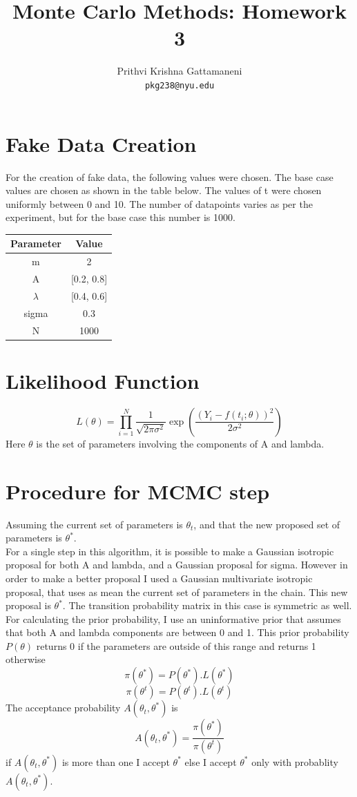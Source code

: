 \documentclass{article}
\title{Monte Carlo Methods: Homework 3}
\author{
  Prithvi Krishna Gattamaneni\\
  \texttt{pkg238@nyu.edu} \\
}
\begin{document}
\maketitle

\section{Fake Data Creation} %
For the creation of fake data, the following values were chosen. The base case values are chosen as shown in the table below. The values of t were chosen uniformly between 0 and 10. The number of datapoints varies as per the experiment, but for the base case this number is 1000.\\
\begin{center}
	\begin{tabular}{ |c| c| }
		\hline
		Parameter & Value\\
		\hline
		m & 2 \\ 
		A & [0.2, 0.8] \\  
		$\lambda$ & [0.4, 0.6]\\
		sigma & 0.3 \\
		N & 1000\\
		\hline
	\end{tabular}
\end{center}


\section{Likelihood Function} %
\[
L(\theta) = \prod_{i=1}^{N} \frac{1}{\sqrt{2\pi\sigma^2}}\exp\left( \frac{(Y_i - f(t_i;\theta))^2}{2\sigma^2} \right)
\]
Here $\theta$ is the set of parameters involving the components of A and lambda.


\section{Procedure for MCMC step} %
Assuming the current set of parameters is $\theta_t$, and that the new proposed set of parameters is $\theta^*$.
\\
For a single step in this algorithm, it is possible to make a Gaussian isotropic proposal for both A and lambda, and a Gaussian proposal for sigma. However in order to make a better proposal I used a Gaussian multivariate isotropic proposal, that uses as mean the current set of parameters in the chain. This new proposal is $\theta^*$. The transition probability matrix in this case is symmetric as well. 
For calculating the prior probability, I use an uninformative prior that assumes that both A and lambda components are between 0 and 1. This prior probability $P(\theta)$ returns 0 if the parameters are outside of this range and returns 1 otherwise\\
\[
\pi(\theta^*) = P(\theta^*).L(\theta^*)
\]
\[
\pi(\theta^t) = P(\theta^t).L(\theta^t)
\]
The acceptance probability $A(\theta_t, \theta^*)$ is
\[
A(\theta_t, \theta^*) = \frac{\pi(\theta^*)}{\pi(\theta^t)}
\]
if $A(\theta_t, \theta^*)$ is more than one I accept $\theta^*$ else I accept $\theta^*$ only with probablity $A(\theta_t, \theta^*)$.
\end{document}
